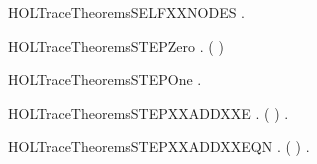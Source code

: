 \newcommand{\HOLTraceTheoremsReachXXtrans}{\UseVerbatim{HOLTraceTheoremsReachXXtrans}}
\begin{SaveVerbatim}{HOLTraceTheoremsSELFXXNODES}
\HOLTokenTurnstile{} \HOLSymConst{\HOLTokenForall{}}.  \HOLConst{\HOLTokenIn{}}  
\end{SaveVerbatim}
\newcommand{\HOLTraceTheoremsSELFXXNODES}{\UseVerbatim{HOLTraceTheoremsSELFXXNODES}}
\begin{SaveVerbatim}{HOLTraceTheoremsSTEPZero}
\HOLTokenTurnstile{} \HOLSymConst{\HOLTokenForall{}} .     \HOLSymConst{\HOLTokenEquiv{}} ( \HOLSymConst{=} )
\end{SaveVerbatim}
\newcommand{\HOLTraceTheoremsSTEPZero}{\UseVerbatim{HOLTraceTheoremsSTEPZero}}
\begin{SaveVerbatim}{HOLTraceTheoremsSTEPOne}
\HOLTokenTurnstile{}     \HOLSymConst{\HOLTokenEquiv{}} \HOLSymConst{\HOLTokenExists{}}.  \HOLTokenTransBegin{}\HOLTokenTransEnd {}
\end{SaveVerbatim}
\newcommand{\HOLTraceTheoremsSTEPOne}{\UseVerbatim{HOLTraceTheoremsSTEPOne}}
\begin{SaveVerbatim}{HOLTraceTheoremsSTEPXXADDXXE}
\HOLTokenTurnstile{} \HOLSymConst{\HOLTokenForall{}}   .   ( \HOLSymConst{+} )  \HOLSymConst{\HOLTokenImp{}} \HOLSymConst{\HOLTokenExists{}}.     \HOLSymConst{\HOLTokenConj{}}    
\end{SaveVerbatim}
\newcommand{\HOLTraceTheoremsSTEPXXADDXXE}{\UseVerbatim{HOLTraceTheoremsSTEPXXADDXXE}}
\begin{SaveVerbatim}{HOLTraceTheoremsSTEPXXADDXXEQN}
\HOLTokenTurnstile{} \HOLSymConst{\HOLTokenForall{}}   .   ( \HOLSymConst{+} )  \HOLSymConst{\HOLTokenEquiv{}} \HOLSymConst{\HOLTokenExists{}}.     \HOLSymConst{\HOLTokenConj{}}    
\end{SaveVerbatim}
